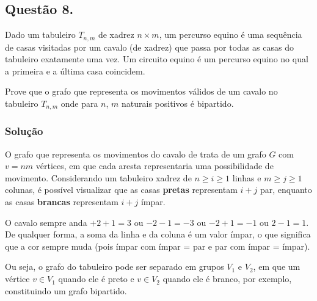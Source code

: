 \documentclass[12pt, letterpaper]{report}
\newcounter{ProblemNum}
\newcommand*{\anyproblem}[1]{\newpage\subsection*{#1}}
\newcommand*{\problem}[1]{\stepcounter{ProblemNum} %
   \anyproblem{Questão #1}}
\newcommand*{\soln}[1]{\subsubsection*{#1}}
\newcommand*{\solution}{\soln{Solução}}
\begin{document}
\problem{8.}
  Dado um tabuleiro $ T_{n,m} $ de xadrez $ n \times m $, um percurso equino é uma sequência de casas visitadas por um cavalo (de xadrez) que passa por todas as casas do tabuleiro exatamente uma vez. Um circuito equino é um percurso equino no qual a primeira e a última casa coincidem.

  Prove que o grafo que representa os movimentos válidos de um cavalo no tabuleiro $ T_{n,m} $ onde para $ n $, $ m $ naturais positivos é bipartido.

\solution
  O grafo que representa os movimentos do cavalo de trata de um grafo $G$ com $v = nm$ vértices, em que cada aresta representaria uma possibilidade de movimento.
  Considerando um tabuleiro xadrez de $n \geq i \geq 1$ linhas e $m \geq j \geq 1$ colunas, é possível visualizar que as casas \textbf{pretas} representam $i + j$ par, enquanto as casas \textbf{brancas} representam $i + j$ ímpar.

  O cavalo sempre anda $+ 2 + 1 = 3$ ou $- 2 - 1= -3$ ou $-2 + 1 = -1$ ou $2 - 1 = 1$. De qualquer forma, a soma da linha e da coluna é um valor ímpar, o que significa que a cor sempre muda (pois ímpar com ímpar = par e par com ímpar = ímpar).

  Ou seja, o grafo do tabuleiro pode ser separado em grupos $V_1$ e $V_2$, em que um vértice $v \in V_1$ quando ele é preto e $v \in V_2$ quando ele é branco, por exemplo, constituindo um grafo bipartido.
\end{document}

